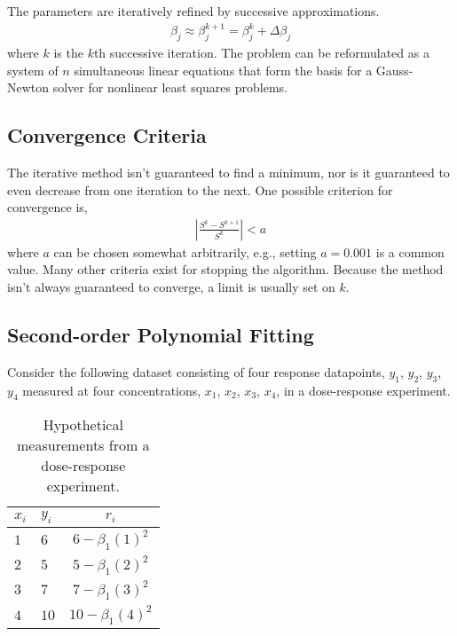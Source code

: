 \documentclass[11pt,a4paper]{article}
\begin{document}
The parameters are iteratively refined by successive approximations.
\begin{align}
\beta_{j} \approx \beta_{j}^{k + 1} = \beta_{j}^{k} + \Delta\beta_{j}
\end{align}
where \(k\) is the \(k\)th successive iteration. 
The problem can be reformulated as a system of \(n\) simultaneous linear equations that
form the basis for a Gauss-Newton solver for nonlinear least squares problems.

\subsection{Convergence Criteria}

The iterative method isn't guaranteed to find a minimum, 
nor is it guaranteed to even decrease from one iteration to the next. 
One possible criterion for convergence is,
\begin{align}
\left| \frac{S^{k} - S^{k + 1}}{S^{k}} \right| < a
\end{align}
where \(a\) can be chosen somewhat arbitrarily, 
e.g., setting \(a=0.001\) is a common value. 
Many other criteria exist for stopping the algorithm. 
Because the method isn't always guaranteed to converge, 
a limit is usually set on \(k\).

\subsection{Second-order Polynomial Fitting}

Consider the following dataset consisting of four response datapoints,
\(y_{1}\), \(y_{2}\), \(y_{3}\), \(y_{4}\) measured at four concentrations,
\(x_{1}\), \(x_{2}\), \(x_{3}\), \(x_{4}\), 
in a dose-response experiment.

\begin{table}[h!]
\centering
\begin{tabular}{| l | l | c |}
\hline
$x_{i}$  & $y_{i}$ & $r_{i}$\\\hline
\(1\) & \(6\) & \(6 - \beta_{1}(1)^{2}\) \\
\(2\) & \(5\) & \(5 - \beta_{1}(2)^{2}\) \\
\(3\) & \(7\) & \(7 - \beta_{1}(3)^{2}\) \\
\(4\) & \(10\) & \(10 - \beta_{1}(4)^{2}\) \\\hline
\end{tabular}
\caption{%
Hypothetical measurements from a dose-response experiment.
}
\label{tab:residuals}
\end{table}
\end{document}
